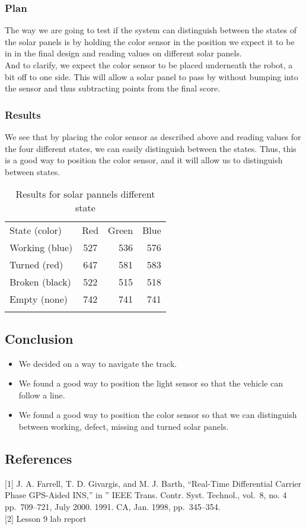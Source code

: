 \subsubsection{Plan}

The way we are going to test if the system can distinguish between the
states of the solar panels is by holding the color sensor in the
position we expect it to be in in the final design and reading values on
different solar panels.\\And to clarify, we expect the color sensor to
be placed underneath the robot, a bit off to one side. This will allow a
solar panel to pass by without bumping into the sensor and thus
subtracting points from the final score.

\subsubsection{Results}

We see that by placing the color sensor as described above and reading
values for the four different states, we can easily distinguish between
the states. Thus, this is a good way to position the color sensor, and
it will allow us to distinguish between states.

\begin{longtable}[c]{@{}lcrr@{}}
  \hline\noalign{\medskip} State (color) & Red & Green & Blue
  \\\noalign{\medskip} \hline\noalign{\medskip} Working (blue) & 527
  & 536 & 576 \\\noalign{\medskip} Turned (red) & 647 & 581 & 583
  \\\noalign{\medskip} Broken (black) & 522 & 515 & 518
  \\\noalign{\medskip} Empty (none) & 742 & 741 & 741
  \\\noalign{\medskip} \hline
\caption{Results for solar pannels different state}
\end{longtable}

\subsection{Conclusion}

\begin{itemize}
\itemsep1pt\parskip0pt
\item
  We decided on a way to navigate the track.
\item
  We found a good way to position the light sensor so that the vehicle
  can follow a line.
\item
  We found a good way to position the color sensor so that we can
  distinguish between working, defect, missing and turned solar panels.
\end{itemize}

\subsection{References}

{[}1{]} J. A. Farrell, T. D. Givargis, and M. J. Barth, ``Real-Time
Differential Carrier Phase GPS-Aided INS,'' in '' IEEE Trans. Contr.
Syst. Technol., vol.~8, no. 4 pp.~709--721, July 2000. 1991. CA, Jan.
1998, pp.~345--354.\\
{[}2{]} Lesson 9 lab report
